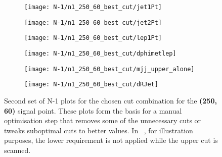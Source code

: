 \begin{figure}
	\centering
	\begin{subfigure}[b]{0.5\linewidth}
		\centering\texttt{[image: N-1/n1\_250\_60\_best\_cut/jet1Pt]}
		\caption{\label{fig:result_250_60_jet1Pt}}
	\end{subfigure}%
	\begin{subfigure}[b]{0.5\linewidth}
		\centering\texttt{[image: N-1/n1\_250\_60\_best\_cut/jet2Pt]}
		\caption{\label{fig:result_250_60_jet2Pt}}
	\end{subfigure}	
	\begin{subfigure}[b]{0.5\linewidth}
		\centering\texttt{[image: N-1/n1\_250\_60\_best\_cut/lep1Pt]}
		\caption{\label{fig:result_250_60_lep1Pt}}
	\end{subfigure}%
	\begin{subfigure}[b]{0.5\linewidth}
		\centering\texttt{[image: N-1/n1\_250\_60\_best\_cut/dphimetlep]}
		\caption{\label{fig:result_250_60_dphimetlep}}
	\end{subfigure}
	\begin{subfigure}[b]{0.5\linewidth}
		\centering\texttt{[image: N-1/n1\_250\_60\_best\_cut/mjj\_upper\_alone]}
		\caption{\label{fig:result_250_60_mjj_upper}}
	\end{subfigure}%
	\begin{subfigure}[b]{0.5\linewidth}
		\centering\texttt{[image: N-1/n1\_250\_60\_best\_cut/dRJet]}
		\caption{\label{fig:result_250_60_dRJet}}
	\end{subfigure}
	\caption[N-1 plots for the chosen cut combination for the (250,60) signal point, 2/2]{Second set of N-1 plots for the chosen cut combination for the \textbf{(250, 60)} signal point. These plots form the basis for a manual optimisation step that removes some of the unnecessary cuts or tweaks suboptimal cuts to better values. In \figname~, for illustration purposes, the lower requirement is not applied while the upper cut is scanned.}
	\label{fig:results_250_60_n-1}
\end{figure}

